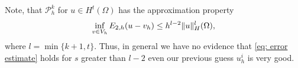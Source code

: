 	Note, that $\mathcal P^k_h$ for $u \in H^t(\Omega)$ has the approximation property 
	\[
		\inf_{v \in V_h} E_{2,h}(u-v_h) \leq h^{l-2} \lVert u \rVert_H^l(\Omega),
	\]
	where $l = \min\{k+1,t\}$.
	Thus, in general we have no evidence that \eqref{eq: error estimate} holds for $s$ greater than $l-2$ even our previous guess $u_h^i$ is very good.
